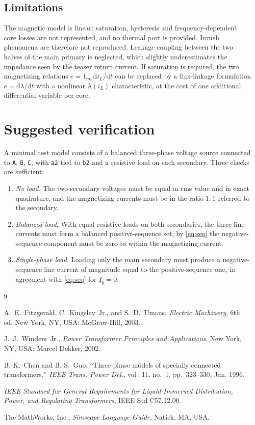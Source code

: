 \documentclass[11pt,a4paper]{article}
\newcommand{\ph}[1]{\underline{#1}}
\begin{document}
\subsection{Limitations}

The magnetic model is linear: saturation, hysteresis and frequency-dependent
core losses are not represented, and no thermal port is provided. Inrush
phenomena are therefore not reproduced. Leakage coupling between the two halves
of the main primary is neglected, which slightly underestimates the impedance
seen by the teaser return current. If saturation is required, the two
magnetizing relations $e = L_m\,\mathrm{d}i_L/\mathrm{d}t$ can be replaced by a
flux-linkage formulation $e = \mathrm{d}\lambda/\mathrm{d}t$ with a nonlinear
$\lambda(i_L)$ characteristic, at the cost of one additional differential
variable per core.

\section{Suggested verification}

A minimal test model consists of a balanced three-phase voltage source
connected to \texttt{A}, \texttt{B}, \texttt{C}, with \texttt{a2} tied to
\texttt{b2} and a resistive load on each secondary. Three checks are
sufficient:
\begin{enumerate}
\item \emph{No load.} The two secondary voltages must be equal in rms value and
in exact quadrature, and the magnetizing currents must be in the ratio
$1:1$ referred to the secondary.
\item \emph{Balanced load.} With equal resistive loads on both secondaries, the
three line currents must form a balanced positive-sequence set; by
\eqref{eq:seq} the negative-sequence component must be zero to within the
magnetizing current.
\item \emph{Single-phase load.} Loading only the main secondary must produce a
negative-sequence line current of magnitude equal to the positive-sequence one,
in agreement with \eqref{eq:seq} for $\ph{I}_b = 0$.
\end{enumerate}

\begin{thebibliography}{9}

A.~E.~Fitzgerald, C.~Kingsley~Jr., and S.~D.~Umans,
\emph{Electric Machinery}, 6th ed. New York, NY, USA: McGraw-Hill, 2003.

J.~J.~Winders~Jr.,
\emph{Power Transformer Principles and Applications}.
New York, NY, USA: Marcel Dekker, 2002.

B.-K.~Chen and B.-S.~Guo,
``Three-phase models of specially connected transformers,''
\emph{IEEE Trans. Power Del.}, vol.~11, no.~1, pp.~323--330, Jan. 1996.

\emph{IEEE Standard for General Requirements for Liquid-Immersed Distribution,
Power, and Regulating Transformers}, IEEE Std C57.12.00.

The MathWorks, Inc., \emph{Simscape Language Guide}, Natick, MA, USA.

\end{thebibliography}
\end{document}
